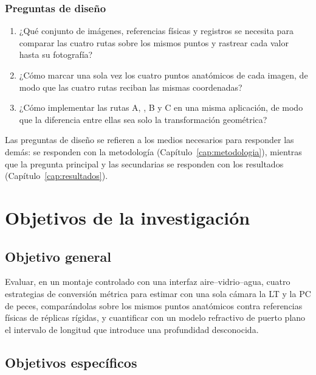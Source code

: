 \subsubsection*{Preguntas de diseño}

\begin{enumerate}
  \item ¿Qué conjunto de imágenes, referencias físicas y registros se necesita para comparar las cuatro rutas sobre los mismos puntos y rastrear cada valor hasta su fotografía?
  \item ¿Cómo marcar una sola vez los cuatro puntos anatómicos de cada imagen, de modo que las cuatro rutas reciban las mismas coordenadas?
  \item ¿Cómo implementar las rutas A, \Aprime, B y C en una misma aplicación, de modo que la diferencia entre ellas sea solo la transformación geométrica?
\end{enumerate}

Las preguntas de diseño se refieren a los medios necesarios para responder las demás: se responden con la metodología (Capítulo~\ref{cap:metodologia}), mientras que la pregunta principal y las secundarias se responden con los resultados (Capítulo~\ref{cap:resultados}).

\section{Objetivos de la investigación}

\subsection{Objetivo general}

Evaluar, en un montaje controlado con una interfaz aire--vidrio--agua, cuatro estrategias de conversión métrica para estimar con una sola cámara la LT y la PC de peces, comparándolas sobre los mismos puntos anatómicos contra referencias físicas de réplicas rígidas, y cuantificar con un modelo refractivo de puerto plano el intervalo de longitud que introduce una profundidad desconocida.

\subsection{Objetivos específicos}

